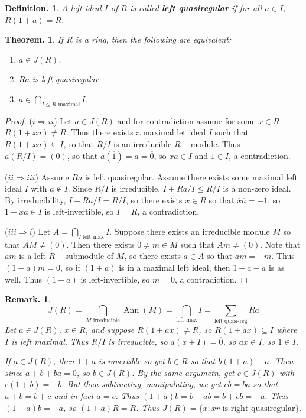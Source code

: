 \documentclass[11pt, a4paper]{memoir}
\newcommand{\imp}[2]{($#1\Rightarrow#2$)\hspace{0.2cm}}
\theoremstyle{change}
\newtheorem{theorem}{Theorem.}[section]
\theoremstyle{plain}
\theoremstyle{nonumberplain}
\newtheorem{definition}{Definition.}
\newtheorem{remark}{Remark.}
\newtheorem{proof}{Proof}
\DeclareMathOperator{\Ann}{Ann}
\numberwithin{equation}{section}
\begin{document}
\begin{definition}
    A left ideal $I$ of $R$ is called \textbf{left quasiregular} if for all $a\in I$, $R(1+a)=R$.
\end{definition}
\begin{theorem}
    If $R$ is a ring, then the following are equivalent:
    \begin{enumerate}[nl,r]
        \item $a\in J(R)$.
        \item $Ra$ is left quasiregular
        \item $a\in\bigcap_{I\leq R\text{ maximal}}I$.
    \end{enumerate}
\end{theorem}
\begin{proof}
    \imp{i}{ii}
    Let $a\in J(R)$ and for contradiction assume for some $x\in R$ $R(1+xa)\neq R$.
    Thus there exists a maximal let ideal $I$ such that $R(1+xa)\subseteq I$, so that $R/I$ is an irreducible $R-$module.
    Thus $a(R/I)=(0)$, so that $a(\overline{1})=\overline{a}=\overline{0}$, so $xa\in I$ and $1\in I$, a contradiction.

    \imp{ii}{iii}
    Assume $Ra$ is left quasiregular.
    Assume there exists some maximal left ideal $I$ with $a\notin I$.
    Since $R/I$ is irreducible, $I+Ra/I\leq R/I$ is a non-zero ideal.
    By irreducibility, $I+Ra/I=R/I$, so there exists $x\in R$ so that $\overline{x}\overline{a}=\overline{-1}$, so $1+xa\in I$ is left-invertible, so $I=R$, a contradiction.

    \imp{iii}{i}
    Let $A=\bigcap_{I\text{ left max}}I$.
    Suppose there exists an irreducible module $M$ so that $AM\neq(0)$.
    Then there exists $0\neq m\in M$ such that $Am\neq(0)$.
    Note that $am$ is a left $R-$submodule of $M$, so there exists $a\in A$ so that $am=-m$.
    Thus $(1+a)m=0$, so if $(1+a)$ is in a maximal left ideal, then $1+a-a$ is as well.
    Thus $(1+a)$ is left-invertible, so $m=0$, a contradiction.
\end{proof}
\begin{remark}
    \begin{equation*}
        J(R)=\bigcap_{M\text{ irreducible}}\Ann(M)=\bigcap_{\text{left max}}I=\sum_{\text{left quasi-reg}}Ra
    \end{equation*}
    Let $a\in J(R)$, $x\in R$, and suppose $R(1+ax)\neq R$, so $R(1+ax)\subseteq I$ where $I$ is left maximal.
    Thus $R/I$ is irreducible, so $a(x+I)=\overline{0}$, so $ax\in I$, so $1\in I$.

    If $a\in J(R)$, then $1+a$ is invertible so get $b\in R$ so that $b(1+a)-a$.
    Then since $a+b+ba=0$, so $b\in J(R)$.
    By the same argumetn, get $c\in J(R)$ with $c(1+b)=-b$.
    But then subtracting, manipulating, we get $cb=ba$ so that $a+b=b+c$ and in fact $a=c$.
    Thus $(1+a)b=b+ab=b+cb=-a$.
    Thus $(1+a)b=-a$, so $(1+a)R=R$.
    Thus $J(R)=\{x:xr\text{ is right quasiregular}\}$.
\end{remark}
\end{document}
